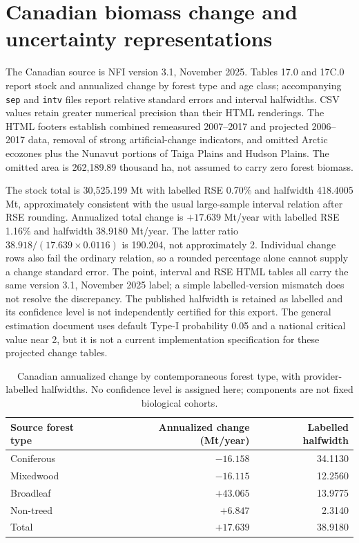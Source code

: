 \section{Canadian biomass change and uncertainty representations}
The Canadian source is NFI version 3.1, November 2025. Tables 17.0 and 17C.0 report stock and annualized change by forest type and age class; accompanying \texttt{sep} and \texttt{intv} files report relative standard errors and interval halfwidths. CSV values retain greater numerical precision than their HTML renderings. The HTML footers establish combined remeasured 2007--2017 and projected 2006--2017 data, removal of strong artificial-change indicators, and omitted Arctic ecozones plus the Nunavut portions of Taiga Plains and Hudson Plains. The omitted area is 262,189.89 thousand ha, not assumed to carry zero forest biomass.

The stock total is 30,525.199 Mt with labelled RSE 0.70\% and halfwidth 418.4005 Mt, approximately consistent with the usual large-sample interval relation after RSE rounding. Annualized total change is $+17.639$ Mt/year with labelled RSE 1.16\% and halfwidth 38.9180 Mt/year. The latter ratio $38.918/(17.639\times0.0116)$ is 190.204, not approximately 2. Individual change rows also fail the ordinary relation, so a rounded percentage alone cannot supply a change standard error. The point, interval and RSE HTML tables all carry the same version 3.1, November 2025 label; a simple labelled-version mismatch does not resolve the discrepancy. The published halfwidth is retained as labelled and its confidence level is not independently certified for this export. The general estimation document uses default Type-I probability 0.05 and a national critical value near 2, but it is not a current implementation specification for these projected change tables.

\begin{table}[htbp]\centering\small
\caption{Canadian annualized change by contemporaneous forest type, with provider-labelled halfwidths. No confidence level is assigned here; components are not fixed biological cohorts.}\label{tab:SI_Canada_components}
\begin{tabular}{lrr}\toprule
Source forest type & Annualized change (Mt/year) & Labelled halfwidth\\\midrule
Coniferous & $-16.158$ & 34.1130\\
Mixedwood & $-16.115$ & 12.2560\\
Broadleaf & $+43.065$ & 13.9775\\
Non-treed & $+6.847$ & 2.3140\\
Total & $+17.639$ & 38.9180\\\bottomrule
\end{tabular}\end{table}

